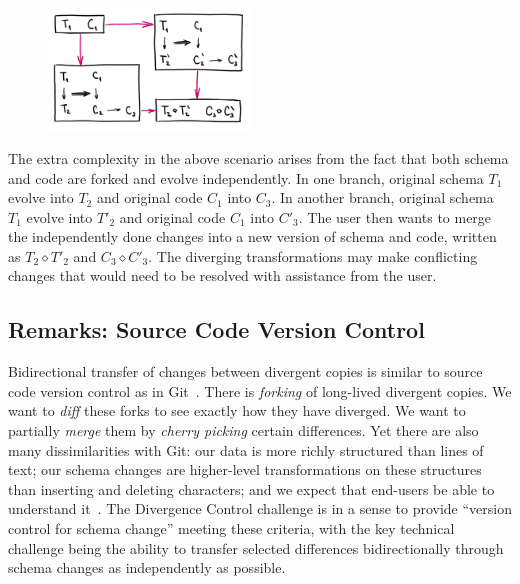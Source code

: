 \documentclass[english,submission]{programming}
\DeclareRobustCommand{\frameworkbox}[1]{\leftbar#1\endleftbar}
\newcommand{\frameworkboxtitle}[1]{\noindent{\firamedium #1.}\quad}
\begin{document}
\frameworkbox{
\begin{figure}
\vspace{-0.5em}
\includegraphics[width=14.5em]{figures/arr-divergence.png}
\vspace{-1.5em}
\end{figure}
\frameworkboxtitle{Maintaining Divergent Variants}
The extra complexity in the above scenario arises from the fact that both schema and
code are forked and evolve independently. In one branch, original schema $T_1$ evolve
into $T_2$ and original code $C_1$ into $C_3$. In another branch, original schema $T_1$
evolve into $T'_2$ and original code $C_1$ into $C'_3$. The user then wants to merge
the independently done changes into a new version of schema and code, written as
$T_2 \diamond T'_2$ and $C_3 \diamond C'_3$. The diverging transformations may make
conflicting changes that would need to be resolved with assistance from the user.}


\subsection*{Remarks: Source Code Version Control}

Bidirectional transfer of changes between divergent copies is similar to source code version
control as in Git~\cite{ProGit}. There is \textit{forking} of long-lived divergent copies.
We want to \textit{diff} these forks to see exactly how they have diverged. We want to
partially \textit{merge} them by \textit{cherry picking} certain differences. Yet there are
also many dissimilarities with Git: our data is more richly structured than lines of text; our
schema changes are higher-level transformations on these structures than inserting and
deleting characters; and we expect that end-users be able to understand it~\cite{gitless}.
The Divergence Control challenge is in a sense to provide ``version control for schema
change'' meeting these criteria, with the key technical challenge being the ability to
transfer selected differences bidirectionally through schema changes as independently as possible.
\end{document}
